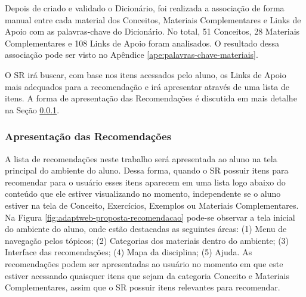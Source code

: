 Depois de criado e validado o Dicionário, foi realizada a associação de forma manual entre cada material dos Conceitos,
Materiais Complementares e Links de Apoio com as palavras-chave do Dicionário. No total, 51 Conceitos, 28 Materiais
Complementares e 108 Links de Apoio foram analisados. O resultado dessa associação pode ser visto no Apêndice \ref{ape:palavras-chave-materiais}.

O SR irá buscar, com base nos itens acessados pelo aluno, os Links de Apoio mais adequados
para a recomendação e irá apresentar através de uma lista de itens. A forma de apresentação das Recomendações é discutida
em mais detalhe na Seção \ref{subsection:apresentacao-recomendacoes}.

\subsubsection{Apresentação das Recomendações}\label{subsection:apresentacao-recomendacoes}

A lista de recomendações neste trabalho será apresentada ao aluno na tela principal do ambiente do aluno. Dessa forma,
quando o SR possuir itens para recomendar para o usuário esses itens aparecem em uma lista logo abaixo do conteúdo que
ele estiver visualizando no momento, independente se o aluno estiver na tela de Conceito, Exercícios, Exemplos ou
Materiais Complementares. Na Figura \ref{fig:adaptweb-proposta-recomendacao} pode-se observar a tela inicial do ambiente do
aluno, onde estão destacadas as seguintes áreas: (1) Menu de navegação pelos tópicos; (2) Categorias dos materiais dentro
do ambiente; (3) Interface das recomendações; (4) Mapa da disciplina; (5) Ajuda. As recomendações podem ser apresentadas ao usuário no momento em que este estiver acessando
quaisquer itens que sejam da categoria Conceito e Materiais Complementares, assim que o SR possuir itens relevantes para recomendar.


